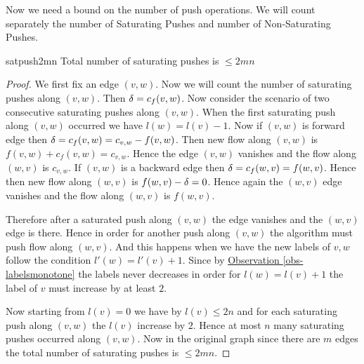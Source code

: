 Now we need a bound on the number of push operations. We will count separately the number of Saturating Pushes and number of Non-Saturating Pushes.
\begin{lemma}{}{satpush2mn}
	Total number of saturating pushes is $\leq 2mn$
\end{lemma}
\begin{proof}
	We first fix an edge $(v,w)$. Now we will count the number of saturating pushes along $(v,w)$. Then $\delta=c_f(v,w)$.  Now consider the scenario of  two consecutive saturating pushes along $(v,w)$. When the first saturating push along $(v,w)$ occurred we have $l(w)=l(v)-1$. Now if $(v,w)$ is forward edge then $\delta=c_f(v,w)=c_{v,w}-f(v,w)$. Then new flow along $(v,w)$ is $f(v,w)+c_f(v,w)=c_{v,w}$. Hence the edge $(v,w)$ vanishes and the flow along $(w,v)$ is $c_{v,w}$. If $(v,w)$ is a backward edge then $\delta=c_f(w,v)=f(w,v)$. Hence then new flow along $(w,v)$ is $f(w,v)-\delta=0$. Hence again the $(w,v)$ edge vanishes and the flow along $(w,v)$ is $f(w,v)$.

	\begin{center}
	\end{center}

	Therefore after a saturated push along $(v,w)$ the edge vanishes and the $(w,v)$ edge is there. Hence in order for another push along $(v,w)$ the algorithm must push flow along $(w,v)$. And this happens when we have the new labels of $v,w$ follow the condition $l'(w)=l'(v)+1$. Since by \hyperref[obs-labelsmonotone]{Observation \ref{obs-labelsmonotone}} the labels never decreases in order for $l(w)=l(v)+1$ the label of $v$ must  increase  by at least $2$.

	Now starting from $l(v)=0$ we have by  $l(v)\leq 2n$ and for each saturating push along $(v,w)$ the $l(v)$ increase by $2$. Hence at most $n$ many saturating pushes occurred along $(v,w)$. Now in the original graph since there are $m$ edges the total number of saturating pushes is $\leq 2mn$.
\end{proof}



